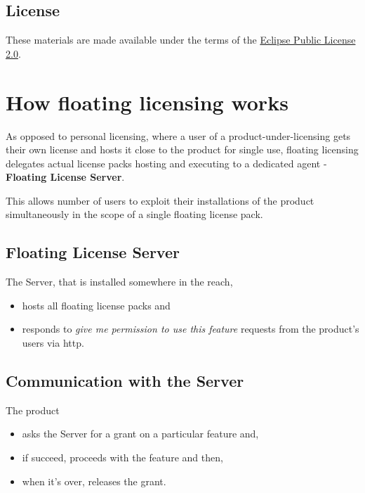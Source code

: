 \documentclass[12pt]{report}
\begin{document}
\section*{License}
These materials are made available under the terms of the \href{https://www.eclipse.org/legal/epl-2.0/}{Eclipse Public License 2.0}.

\chapter*{How floating licensing works}

As opposed to personal licensing, where a user of a product-under-licensing 
gets their own license and hosts it close to the product for single use,
floating licensing delegates actual license packs hosting and executing to a dedicated agent - \textbf{Floating License Server}. 

This allows number of users to exploit their installations of the product simultaneously in the scope of a single floating license pack. 

\section*{Floating License Server}

The Server, that is installed somewhere in the reach, 
\begin{itemize}
    \item hosts all floating license packs and
    \item responds to \textit{give me permission to use this feature} requests from the product's users via http.
\end{itemize}

\section*{Communication with the Server}

The product 
\begin{itemize}
    \item asks the Server for a grant on a particular feature and, 
    \item if succeed, proceeds with the feature and then, 
    \item when it's over, releases the grant.
\end{itemize} 
\end{document}
